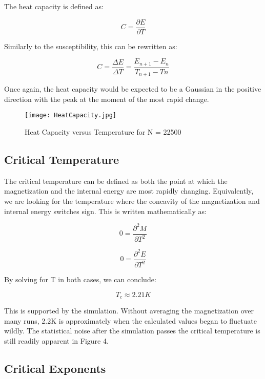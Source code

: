 \documentclass[10pt,letterpaper]{article}
\begin{document}
The heat capacity is defined as:

\begin{equation}
C = \frac{\partial{E}}{\partial{T}}
\end{equation}

Similarly to the susceptibility, this can be rewritten as:

\begin{equation}
C = \frac{\Delta{E}}{\Delta{T}} = \frac{E_{n+1} - E_{n}}{T_{n+1} - T{n}}
\end{equation}

Once again, the heat capacity would be expected to be a Gaussian in the positive direction with the peak at the moment of the most rapid change.

\begin{figure}[H]
\centering
\texttt{[image: HeatCapacity.jpg]}
\caption{Heat Capacity versus Temperature for N = 22500}
\end{figure}

\subsection{Critical Temperature}

The critical temperature can be defined as both the point at which the magnetization and the internal energy are most rapidly changing. Equivalently, we are looking for the temperature where the concavity of the magnetization and internal energy switches sign. This is written mathematically as:

\begin{equation}
0 = \frac{\partial^{2}M}{\partial{T}^{2}}
\end{equation}

\begin{equation}
0 = \frac{\partial^{2}E}{\partial{T}^{2}}
\end{equation}

By solving for T in both cases, we can conclude:

\begin{equation}
T_{c} \approx 2.21K
\end{equation}

This is supported by the simulation. Without averaging the magnetization over many runs, 2.2K is approximately when the calculated values began to fluctuate wildly. The statistical noise after the simulation passes the critical temperature is still readily apparent in Figure 4. 

\subsection{Critical Exponents}
\end{document}
